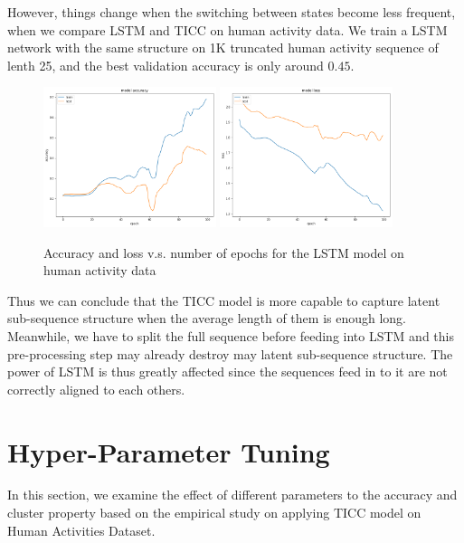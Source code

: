 \documentclass{llncs}
\begin{document}
However, things change when the switching between states become less frequent, when we compare LSTM and TICC on human activity data. We train a LSTM network with the same structure on 1K truncated human activity sequence of lenth 25, and the best validation accuracy is only around $0.45$.

\begin{figure}[H]
	\centering
	\includegraphics[width=0.45\textwidth]{LSTM_Accuracy_HAD.png}
	\includegraphics[width=0.45\textwidth]{LSTM_Loss_HAD.png}
	\caption{Accuracy and loss v.s. number of epochs for the LSTM model on human activity data}
	\label{fig:learning_curve2}
\end{figure}

Thus we can conclude that the TICC model is more capable to capture latent sub-sequence structure when the average length of them is enough long. Meanwhile, we have to split the full sequence before feeding into LSTM and this pre-processing step may already destroy may latent sub-sequence structure. The power of LSTM is thus greatly affected since the sequences feed in to it are not correctly aligned to each others. 

\section{Hyper-Parameter Tuning}
In this section, we examine the effect of different parameters to the accuracy and cluster property based on the empirical study on applying TICC model on Human Activities Dataset.
\end{document}
